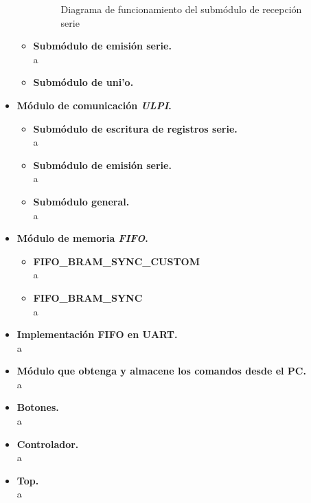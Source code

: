 \begin{itemize}
\begin{itemize}
        \begin{figure}[hbt]
            \centering
            
            \caption{Diagrama de funcionamiento del submódulo de recepción serie}
            \label{fig:flujo_uart_rx}
        \end{figure}

        \item \textbf{Submódulo de emisión serie.} \\
        a
        
        \item \textbf{Submódulo de uni'o.} \\
        
    \end{itemize}
    
    \item \textbf{Módulo de comunicación \emph{ULPI}.} \\
    \begin{itemize}
        \item \textbf{Submódulo de escritura de registros serie.} \\
        a

        \item \textbf{Submódulo de emisión serie.} \\
        a
        
        \item \textbf{Submódulo general.} \\
        a
    \end{itemize}
    
    \item \textbf{Módulo de memoria \emph{FIFO}.} \\
    \begin{itemize}
        \item \textbf{FIFO\_BRAM\_SYNC\_CUSTOM} \\
        a

        \item \textbf{FIFO\_BRAM\_SYNC} \\
        a
    \end{itemize}
    
    \item \textbf{Implementación FIFO en UART.} \\
    a
    
    \item \textbf{Módulo que obtenga y almacene los comandos desde el PC.} \\
    a
    
    \item \textbf{Botones.} \\
    a
    
    \item \textbf{Controlador.} \\
    a
    
    \item \textbf{Top.} \\
    a
\end{itemize}

